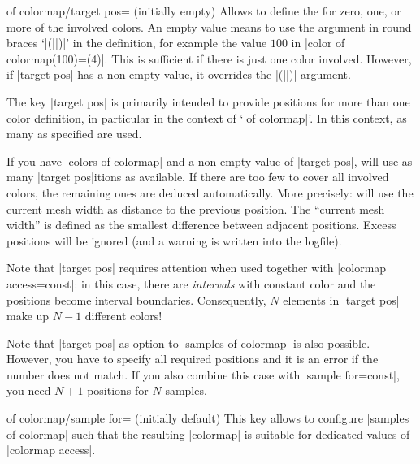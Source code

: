 {\begin{enumerate}
        \begin{pgfplotskey}{of colormap/target pos= (initially empty)}
            Allows to define the  for zero, one, or more of the
            involved colors. An empty value means to use the argument in round
            braces `|(||)|' in the definition, for example the
            value $100$ in |color of colormap(100)=(4)|. This is sufficient if
            there is just one color involved. However, if |target pos| has a
            non-empty value, it overrides the |(||)| argument.

            The key |target pos| is primarily intended to provide positions for
            more than one color definition, in particular in the context of
            `|of colormap|'. In this context, as many  as
            specified are used.

            If you have |colors of colormap| and a non-empty value of
            |target pos|, \PGFPlots{} will use as many |target pos|itions as
            available. If there are too few to cover all involved colors, the
            remaining ones are deduced automatically. More precisely:
            \PGFPlots{} will use the current mesh width as distance to the
            previous position. The ``current mesh width'' is defined as the
            smallest difference between adjacent positions. Excess positions
            will be ignored (and a warning is written into the logfile).

            Note that |target pos| requires attention when used together with
            |colormap access=const|: in this case, there are \emph{intervals}
            with constant color and the positions become interval boundaries.
            Consequently, $N$ elements in |target pos| make up $N-1$ different
            colors!

            Note that |target pos| as option to |samples of colormap| is also
            possible. However, you have to specify all required positions and
            it is an error if the number does not match. If you also combine
            this case with |sample for=const|, you need $N+1$ positions for $N$
            samples.
        \end{pgfplotskey}

        \begin{pgfplotskey}{of colormap/sample for= (initially default)}
            This key allows to configure |samples of colormap| such that the
            resulting |colormap| is suitable for dedicated values of
            |colormap access|.


\end{pgfplotskey}
\end{enumerate}}
